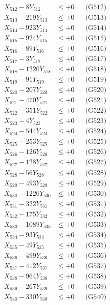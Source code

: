 \documentclass[a4paper,10pt]{article}
\begin{document}
{\begin{align}
X_{512} - 8Y_{512} &\leq +0 && \text{(G512)} \\
X_{513} - 219Y_{513} &\leq +0 && \text{(G513)} \\
X_{514} - 923Y_{514} &\leq +0 && \text{(G514)} \\
X_{515} - 924Y_{515} &\leq +0 && \text{(G515)} \\
X_{516} - 89Y_{516} &\leq +0 && \text{(G516)} \\
X_{517} - 3Y_{517} &\leq +0 && \text{(G517)} \\
X_{518} - 1220Y_{518} &\leq +0 && \text{(G518)} \\
X_{519} - 91Y_{519} &\leq +0 && \text{(G519)} \\
X_{520} - 207Y_{520} &\leq +0 && \text{(G520)} \\
\allowbreak
X_{521} - 470Y_{521} &\leq +0 && \text{(G521)} \\
X_{522} - 351Y_{522} &\leq +0 && \text{(G522)} \\
X_{523} - 4Y_{523} &\leq +0 && \text{(G523)} \\
X_{524} - 544Y_{524} &\leq +0 && \text{(G524)} \\
X_{525} - 253Y_{525} &\leq +0 && \text{(G525)} \\
X_{526} - 126Y_{526} &\leq +0 && \text{(G526)} \\
X_{527} - 128Y_{527} &\leq +0 && \text{(G527)} \\
X_{528} - 56Y_{528} &\leq +0 && \text{(G528)} \\
X_{529} - 493Y_{529} &\leq +0 && \text{(G529)} \\
X_{530} - 1220Y_{530} &\leq +0 && \text{(G530)} \\
\allowbreak
X_{531} - 322Y_{531} &\leq +0 && \text{(G531)} \\
X_{532} - 175Y_{532} &\leq +0 && \text{(G532)} \\
X_{533} - 1089Y_{533} &\leq +0 && \text{(G533)} \\
X_{534} - 93Y_{534} &\leq +0 && \text{(G534)} \\
X_{535} - 49Y_{535} &\leq +0 && \text{(G535)} \\
X_{536} - 499Y_{536} &\leq +0 && \text{(G536)} \\
X_{537} - 412Y_{537} &\leq +0 && \text{(G537)} \\
X_{538} - 964Y_{538} &\leq +0 && \text{(G538)} \\
X_{539} - 267Y_{539} &\leq +0 && \text{(G539)} \\
X_{540} - 330Y_{540} &\leq +0 && \text{(G540)} \\

\end{align}}
\end{document}
